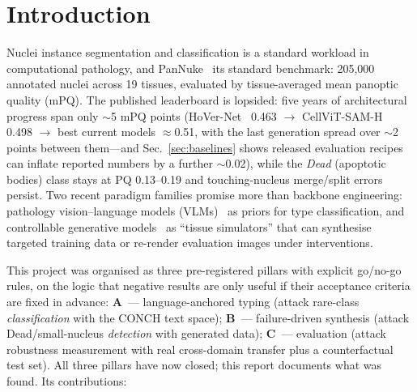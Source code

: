 \documentclass[11pt]{article}
\begin{document}
\section{Introduction}
\label{sec:intro}

Nuclei instance segmentation and classification is a standard workload in computational
pathology, and PanNuke~\cite{gamper2019pannuke} its standard benchmark: 205,000 annotated nuclei
across 19 tissues, evaluated by tissue-averaged mean panoptic quality (mPQ). The published
leaderboard is lopsided: five years of architectural progress span only $\sim$5 mPQ points
(HoVer-Net~\cite{graham2019hovernet} 0.463 $\rightarrow$ CellViT-SAM-H~\cite{horta2024cellvit}
0.498 $\rightarrow$ best current models $\approx$0.51, with the last generation spread over
$\sim$2 points between them---and Sec.~\ref{sec:baselines} shows released evaluation recipes
can inflate reported numbers by a further $\sim$0.02), while the \emph{Dead} (apoptotic
bodies) class stays at PQ 0.13--0.19 and touching-nucleus merge/split errors persist. Two recent paradigm families
promise more than backbone engineering: pathology vision--language models
(VLMs)~\cite{lu2024conch} as priors for type classification, and controllable generative
models~\cite{le2025pixcell} as ``tissue simulators'' that can synthesise targeted training data
or re-render evaluation images under interventions.

This project was organised as three pre-registered pillars with explicit go/no-go rules, on the
logic that negative results are only useful if their acceptance criteria are fixed in advance:
\textbf{A}~--- language-anchored typing (attack rare-class \emph{classification} with the CONCH
text space); \textbf{B}~--- failure-driven synthesis (attack Dead/small-nucleus \emph{detection}
with generated data); \textbf{C}~--- evaluation (attack robustness measurement with real
cross-domain transfer plus a counterfactual test set). All three pillars have now closed; this
report documents what was found. Its contributions:
\end{document}
